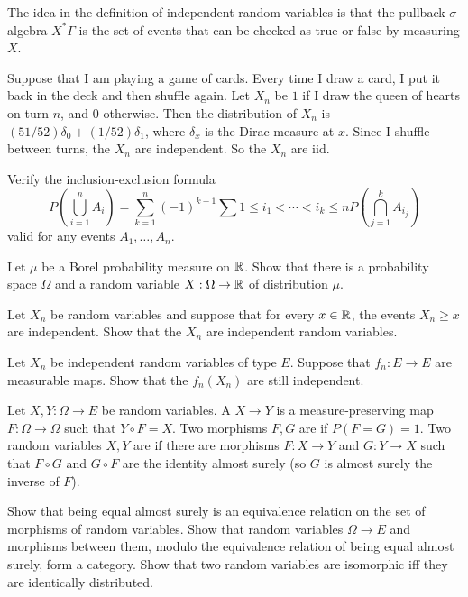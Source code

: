 \begin{subsec}
The idea in the definition of independent random variables is that the pullback $\sigma$-algebra $X^{*}\Gamma$ is the set of events that can be checked as true or false by measuring $X$.
\end{subsec}

\begin{example}
Suppose that I am playing a game of cards.
Every time I draw a card, I put it back in the deck and then shuffle again.
Let $X_{n}$ be $1$ if I draw the queen of hearts on turn $n$, and $0$ otherwise.
Then the distribution of $X_{n}$ is $(51/52)\delta_{0} + (1/52)\delta_{1}$, where $\delta_{x}$ is the Dirac measure at $x$.
Since I shuffle between turns, the $X_{n}$ are independent.
So the $X_{n}$ are iid.
\end{example}

\begin{exercise}
Verify the inclusion-exclusion formula
\[P\left(\bigcup_{i=1}^{n} A_{i}\right) = \sum_{k=1}^{n} {(-1)}^{k+1} \sum{1 \leq i_{1} < \cdots < i_{k} \leq n} P\left(\bigcap_{j=1}^{k} A_{i_{j}}\right)\]
valid for any events $A_{1}, \dots, A_{n}$.
\end{exercise}

\begin{exercise}\label{Skohorod representation}
Let $\mu$ be a Borel probability measure on $\mathbb{R}$.
Show that there is a probability space $\Omega$ and a random variable $X: \Omega \to \mathbb{R}$ of distribution $\mu$.
\end{exercise}

\begin{exercise}
Let $X_{n}$ be random variables and suppose that for every $x \in \mathbb{R}$, the events $X_{n} \geq x$ are independent.
Show that the $X_{n}$ are independent random variables.
\end{exercise}

\begin{exercise}
Let $X_{n}$ be independent random variables of type $E$.
Suppose that $f_{n}: E \to E$ are measurable maps.
Show that the $f_{n}(X_{n})$ are still independent.
\end{exercise}

\begin{exercise}
Let $X, Y: \Omega \to E$ be random variables.
A  $X \to Y$ is a measure-preserving map $F: \Omega \to \Omega$ such that $Y \circ F = X$.
Two morphisms $F,G$ are  if $P(F = G) = 1$.
Two random variables $X,Y$ are  if there are morphisms $F: X \to Y$ and $G: Y \to X$ such that $F \circ G$ and $G \circ F$ are the identity almost surely (so $G$ is almost surely the inverse of $F$).

Show that being equal almost surely is an equivalence relation on the set of morphisms of random variables.
Show that random variables $\Omega \to E$ and morphisms between them, modulo the equivalence relation of being equal almost surely, form a category.
Show that two random variables are isomorphic iff they are identically distributed.
\end{exercise}



